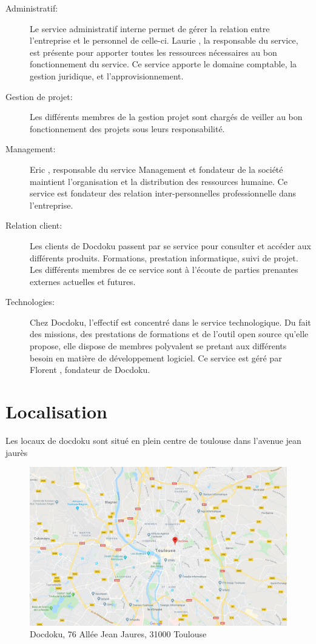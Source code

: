 \documentclass[11pt]{report}
\begin{document}
			\begin{description}
				\item[Administratif: ]Le service administratif interne permet de gérer la relation entre l'entreprise et le personnel de celle-ci. 
			Laurie , la responsable du service, est présente pour apporter toutes les ressources nécessaires
			au bon fonctionnement du service.
			Ce service apporte le domaine comptable, la gestion juridique, et l'approvisionnement. 
				\item[Gestion de projet: ] Les différents membres de la gestion projet sont chargés de veiller au bon fonctionnement des projets sous leurs responsabilité.
				\item[Management: ] Eric , responsable du service Management et fondateur de la société maintient l'organisation et la distribution des ressources humaine. Ce service est fondateur des relation inter-personnelles
			professionnelle dans l'entreprise. 
				\item[Relation client: ] Les clients de Docdoku passent par se service pour consulter et accéder aux différents produits. Formations, prestation informatique, suivi de projet. Les différents membres de ce service sont à l'écoute
			de parties prenantes externes actuelles et futures.
				\item[Technologies: ] Chez Docdoku, l'effectif est concentré dans le service technologique. Du fait des missions, des prestations de formations et de l'outil open source qu'elle propose, elle dispose de membres polyvalent 
			se pretant aux différents besoin en matière de développement logiciel. Ce service est géré par Florent , fondateur de Docdoku.
			\end{description}

		\newpage

		\section{Localisation}

			Les locaux de docdoku sont situé en plein centre de toulouse dans l'avenue jean jaurès

				\begin{figure}[!htb]
					\center
					\includegraphics[scale=0.3]{local.png}
					\caption{Docdoku, 76 Allée Jean Jaures, 31000 Toulouse}
				\end{figure}
\end{document}
